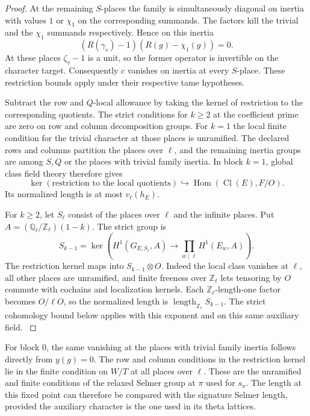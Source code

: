 \begin{proof}
At the remaining
\(S\)-places the family is simultaneously diagonal on inertia
with values \(1\) or \(\chi_1\) on the corresponding
summands. The factors kill the trivial and the \(\chi_1\) summands respectively. Hence on this inertia
\[
 (R(\gamma_v)-1)(R(g)-\chi_1(g))=0.
\]
At these places
\(\zeta_v-1\) is a unit, so the former operator is invertible
on the character target. Consequently \(c\) vanishes on
inertia at every \(S\)-place. These restriction bounds apply under their respective tame hypotheses.
\label{cor:split-selmer-6}

Subtract the row and \(Q\)-local allowance by taking the
kernel of restriction to the corresponding quotients. The
strict conditions for \(k\ge2\) at the coefficient prime
are zero on row and column decomposition groups. For \(k=1\)
the local finite condition for the trivial character at those
places is unramified. The declared rows and columns partition
the places over \(\ell\), and the remaining inertia groups
are among \(S,Q\) or the places with trivial family inertia.
In block \(k=1\), global class field theory therefore gives
\[
 \ker(\text{restriction to the local quotients})\hookrightarrow\operatorname{Hom}(\operatorname{Cl}(E),F/O).
\]
Its normalized length is at
most \(v_\ell(h_E)\).

For \(k\ge2\), let \(S_\ell\) consist of
the places over \(\ell\) and the infinite places. Put
\(A=(\mathbb Q_\ell/\mathbb Z_\ell)(1-k)\). The strict group is
\[
 S_{k-1}=\ker\!\left(H^1(G_{E,S_\ell},A)
        \longrightarrow\prod_{w\mid\ell}H^1(E_w,A)\right).
\]
The restriction kernel maps into \(S_{k-1}\otimes O\).
Indeed the local class vanishes at \(\ell\), all other places
are unramified, and finite freeness over \(\mathbb Z_\ell\) lets
tensoring by \(O\) commute with cochains and localization kernels.
Each \(\mathbb Z_\ell\)-length-one factor becomes \(O/\ell O\),
so the normalized length is \(\operatorname{length}_{\mathbb Z_\ell} S_{k-1}\). The strict
cohomology bound below applies with this exponent and on
this same auxiliary field. \label{cor:split-selmer-7}

\end{proof}
For block \(0\), the same vanishing at the places with trivial
family inertia follows directly from \(y(g)=0\). The row and
column conditions in the restriction kernel lie in the finite
condition on \(W/T\) at all places over \(\ell\). These are
the unramified and finite conditions of the relaxed Selmer
group at \(\pi\) used for \(s_\pi\). The length at this fixed point can therefore be compared with the signature Selmer length, provided the auxiliary character is the one used in its theta lattices.
